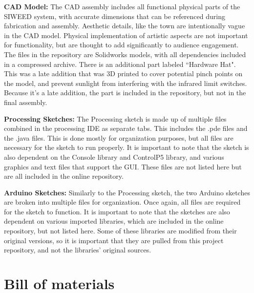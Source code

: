 \documentclass[11pt, letterpaper]{article}
\begin{document}
\textbf{CAD Model:}
The CAD assembly includes all functional physical parts of the SIWEED system, with accurate dimensions that can be referenced during fabrication and assembly.
Aesthetic details, like the town are intentionally vague in the CAD model.
Physical implementation of artistic aspects are not important for functionality, but are thought to add significantly to audience engagement.
The files in the repository are Solidworks models, with all dependencies included in a compressed archive.
There is an additional part labeled ``Hardware Hat". 
This was a late addition that was 3D printed to cover potential pinch points on the model, and prevent sunlight from interfering with the infrared limit switches. 
Because it's a late addition, the part is included in the repository, but not in the final assembly. 
\par


\textbf{Processing Sketches:}
The Processing sketch is made up of multiple files combined in the processing IDE as separate tabs. 
This includes the .pde files and the .java files.
This is done mostly for organization purposes, but all files are necessary for the sketch to run properly. 
It is important to note that the sketch is also dependent on the Console library and ControlP5 library, and various graphics and text files that support the GUI. 
These files are not listed here but are all included in the online repository.
\par


\textbf{Arduino Sketches:}
Similarly to the Processing sketch, the two Arduino sketches are broken into multiple files for organization.
Once again, all files are required for the sketch to function.
It is important to note that the sketches are also dependent on various imported libraries, which are included in the online repository, but not listed here.
Some of these libraries are modified from their original versions, so it is important that they are pulled from this project repository, and not the libraries' original sources.

\section{Bill of materials}
\end{document}

